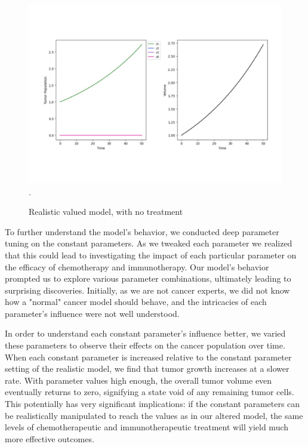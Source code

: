 \documentclass[11pt]{amsart}
\begin{document}
\begin{figure}[h]
\begin{center} %
\includegraphics[width=\textwidth]{parameters_like_paper_no_treatment.pdf}. %
\end{center}
\caption{Realistic valued model, with no treatment}
\label{fig:3}
\end{figure}

To further understand the model's behavior, we conducted deep parameter tuning on the constant parameters. As we tweaked each parameter we realized that this could lead to investigating the impact of each particular parameter on the efficacy of chemotherapy and immunotherapy. Our model's behavior prompted us to explore various parameter combinations, ultimately leading to surprising discoveries. Initially, as we are not cancer experts, we did not know how a "normal" cancer model should behave, and the intricacies of each parameter's influence were not well understood. 

In order to understand each constant parameter's influence better, we varied these parameters to observe their effects on the cancer population over time. When each constant parameter is increased relative to the constant parameter setting of the realistic model, we find that tumor growth increases at a slower rate. With parameter values high enough, the overall tumor volume even eventually returns to zero, signifying a state void of any remaining tumor cells. This potentially has very significant implications: if the constant parameters can be realistically manipulated to reach the values as in our altered model, the same levels of chemotherapeutic and immunotherapeutic treatment will yield much more effective outcomes. 
\end{document}
